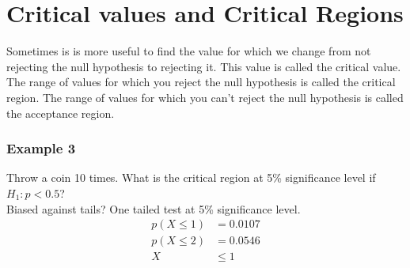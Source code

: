 \documentclass[a4paper,12pt]{article}
\begin{document}
\section*{Critical values and Critical Regions}
Sometimes is is more useful to find the value for which we change from not rejecting the null hypothesis to rejecting it. This value is called the critical value. \\
The range of values for which you reject the null hypothesis is called the critical region. The range of values for which you can't reject the null hypothesis is called the acceptance region. 
\subsubsection*{Example 3}
Throw a coin 10 times. What is the critical region at 5\% significance level if $H_1: p < 0.5$? \\
Biased against tails?
One tailed test at 5\% significance level.
\begin{align*}
p(X \leqslant 1) & = 0.0107 \\
p(X \leqslant 2) & = 0.0546 \\
X & \leqslant 1 \\
\end{align*}
\end{document}
